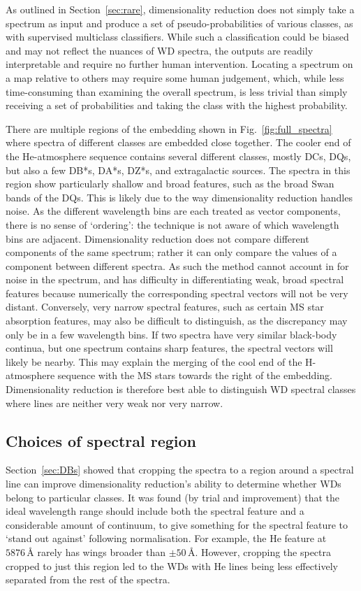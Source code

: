 \documentclass[fleqn,usenatbib]{mnras}
\begin{document}
As outlined in Section~\ref{sec:rare}, dimensionality reduction does not simply take a spectrum as input and produce a set of pseudo-probabilities of various classes, as with supervised multiclass classifiers.
While such a classification could be biased and may not reflect the nuances of WD spectra, the outputs are readily interpretable and require no further human intervention.
Locating a spectrum on a map relative to others may require some human judgement, which, while less time-consuming than examining the overall spectrum, is less trivial than simply receiving a set of probabilities and taking the class with the highest probability.

There are multiple regions of the embedding shown in Fig.~\ref{fig:full_spectra} where spectra of different classes are embedded close together.
The cooler end of the He-atmosphere sequence contains several different classes, mostly DCs, DQs, but also a few DB*s, DA*s, DZ*s, and extragalactic sources.
The spectra in this region show particularly shallow and broad features, such as the broad  Swan bands of the DQs.
This is likely due to the way dimensionality reduction handles noise.
As the different wavelength bins are each treated as vector components, there is no sense of `ordering': the technique is not aware of which wavelength bins are adjacent.
Dimensionality reduction does not compare different components of the same spectrum; rather it can only compare the values of a component between different spectra.
As such the method cannot account in for noise in the spectrum, and has difficulty in differentiating weak, broad spectral features because numerically the corresponding spectral vectors will not be very distant.
Conversely, very narrow spectral features, such as certain MS star absorption features, may also be difficult to distinguish, as the discrepancy may only be in a few wavelength bins.
If two spectra have very similar black-body continua, but one spectrum contains sharp features, the spectral vectors will likely be nearby.
This may explain the merging of the cool end of the H-atmosphere sequence with the MS stars towards the right of the embedding.
Dimensionality reduction is therefore best able to distinguish WD spectral classes where lines are neither very weak nor very narrow.

\subsection{Choices of spectral region}

Section~\ref{sec:DBs} showed that cropping the spectra to a region around a spectral line can improve dimensionality reduction's ability to determine whether WDs belong to particular classes.
It was found (by trial and improvement) that the ideal wavelength range should include both the spectral feature and a considerable amount of continuum, to give something for the spectral feature to `stand out against' following normalisation.
For example, the He feature at $5876\,\text{\AA}$ rarely has wings broader than $\pm50\,\text{\AA}$.
However, cropping the spectra cropped to just this region led to the WDs with He lines being less effectively separated from the rest of the spectra.
\end{document}
